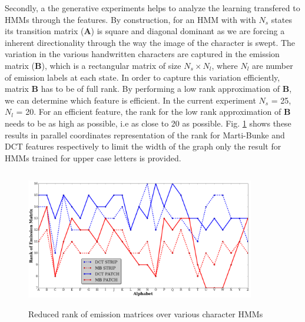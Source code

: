 \documentclass[runningheads]{llncs}
\def\A{{\mathbf A}}
\def\B{{\mathbf B}}
\begin{document}
{Secondly, a the generative experiments helps to analyze the learning transfered to HMMs through the features. By construction, for an HMM with with $N_s$ states its transition matrix ($\A$) is square and diagonal dominant as we are forcing a inherent directionality through the way the image of the character is swept. The variation in the various handwritten characters are captured in the emission matrix ($\B$), which is a rectangular matrix of size $N_s \times N_l$, where $N_l$ are number of emission labels at each state. In order to capture this variation efficiently, matrix $\B$ has to be of full rank. By performing a low rank approximation of $\B$, we can determine which feature is efficient. In the current experiment $N_s$ = 25, $N_l$ = 20. For an efficient feature, the rank for the low rank approximation of $\B$ needs to be as high as possible, i.e as close to 20 as possible. Fig. {\ref{fig:rank}} shows these results in parallel coordinates \cite{Moustafa11} representation of the rank for Marti-Bunke and DCT features respectively to limit the width of the graph only the result for HMMs trained for upper case letters is provided.

\begin{figure}[!t]
\begin{minipage}[b]{1.0\linewidth}
  \centering
  \centerline{\includegraphics[width=10.0cm,height=6.0cm]{rank}}
\end{minipage}
\caption{Reduced rank of emission matrices over various character HMMs}
\label{fig:rank}
\end{figure}

}
\end{document}
